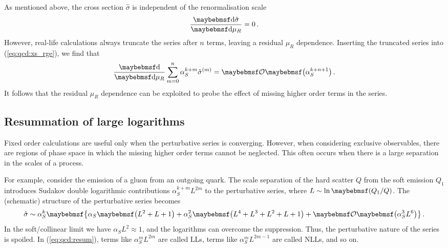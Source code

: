As mentioned above, the cross section $\hat{\sigma}$ is independent of the 
renormalisation scale
\begin{equation}
	\frac{\d{\hat{\sigma}}}{\d{\mu_R}} = 0 \,.
	\label{eq:qcd:xs_rge}
\end{equation}
However, real-life calculations always truncate the series after $n$ terms, leaving a 
residual $\mu_R$ dependence. Inserting the truncated series into (\ref{eq:qcd:xs_rge}), 
we find that
\begin{equation}
	\frac{\d{}}{\d{\mu_R}} \sum\limits_{m=0}^{n} \alpha_S^{k+m} \hat{\sigma}^{(m)}
	= \ofOrder{\alpha_S^{k+n+1}} \,.
\end{equation}
It follows that the residual $\mu_R$ dependence can be exploited to probe the effect of 
missing higher order terms in the series.




\subsection{Resummation of large logarithms}
\label{sec:qcd:resum}

Fixed order calculations are useful only when the perturbative series is converging. 
However, when considering exclusive observables, there are regions of phase space in 
which the missing higher order terms cannot be neglected. This often occurs when there is 
a large separation in the scales of a process.

For example, consider the emission of a gluon from an outgoing quark. The scale 
separation of the hard scatter $Q$ from the soft emission $Q_1$ introduces Sudakov double 
logarithmic contributions $\alpha_S^{k+m} L^{2m}$ to the perturbative series, where 
$L \sim \ln\parenths{Q_1 / Q}$. The (schematic) structure of the perturbative series 
becomes
\begin{equation}
	\hat{\sigma} \sim \alpha_S^k \braces{\alpha_S \parenths{L^2 + L + 1}
	+ \alpha_S^2 \parenths{L^4 + L^3 + L^2 + L + 1} + \ofOrder{\alpha_S^3 L^6}} \,.
	\label{eq:qcd:resum}
\end{equation}
In the soft/collinear limit we have $\alpha_S L^2 \approx 1$, and the logarithms can 
overcome the \alphaS suppression. Thus, the perturbative nature of the series is spoiled. 
In (\ref{eq:qcd:resum}), terms like $\alpha_S^m L^{2m}$ are called \acp{LL}, terms like 
$\alpha_S^{m} L^{2m-1}$ are called \acp{NLL}, and so on.

